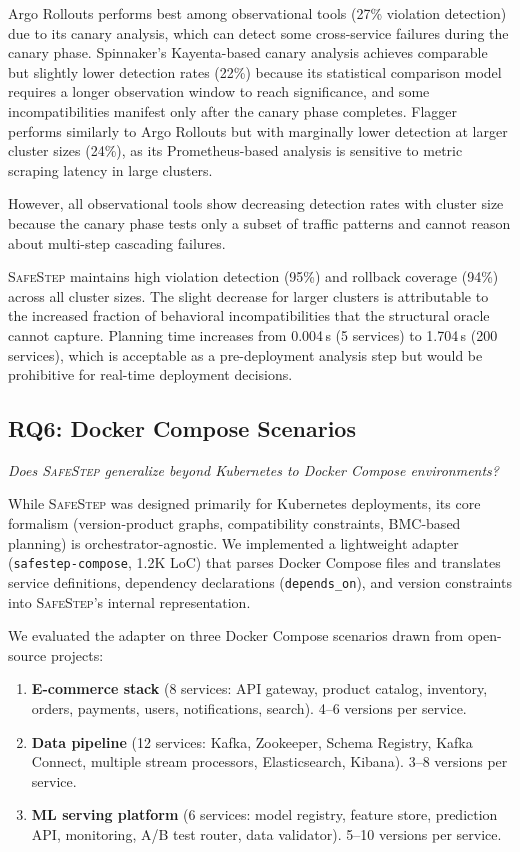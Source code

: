 \documentclass[10pt,twocolumn]{article}
\newcommand{\safestep}{\textsc{SafeStep}}
\begin{document}
Argo Rollouts performs best among observational tools
(27\% violation detection) due to its canary analysis,
which can detect some cross-service failures during the canary
phase. Spinnaker's Kayenta-based canary analysis achieves
comparable but slightly lower detection rates (22\%)
because its statistical comparison model requires a longer
observation window to reach significance, and some
incompatibilities manifest only after the canary phase
completes. Flagger performs similarly to Argo Rollouts but
with marginally lower detection at larger cluster sizes
(24\%), as its Prometheus-based analysis is sensitive
to metric scraping latency in large clusters.

However, all observational tools show decreasing detection rates
with cluster size because the canary phase tests only a subset
of traffic patterns and cannot reason about multi-step
cascading failures.

\safestep{} maintains high violation detection (95\%) and
rollback coverage (94\%) across all cluster sizes. The
slight decrease for larger clusters is attributable to the
increased fraction of behavioral incompatibilities that the
structural oracle cannot capture. Planning time increases
from 0.004\,s (5 services) to 1.704\,s (200 services), which
is acceptable as a pre-deployment analysis step but would be
prohibitive for real-time deployment decisions.

\subsection{RQ6: Docker Compose Scenarios}

\emph{Does \safestep{} generalize beyond Kubernetes to
Docker Compose environments?}

While \safestep{} was designed primarily for Kubernetes
deployments, its core formalism (version-product graphs,
compatibility constraints, BMC-based planning) is
orchestrator-agnostic. We implemented a lightweight adapter
(\texttt{safestep-compose}, 1.2K LoC) that parses Docker
Compose files and translates service definitions, dependency
declarations (\texttt{depends\_on}), and version constraints
into \safestep{}'s internal representation.

We evaluated the adapter on three Docker Compose scenarios
drawn from open-source projects:

\begin{enumerate}[leftmargin=*,nosep]
  \item \textbf{E-commerce stack} (8 services: API gateway,
    product catalog, inventory, orders, payments, users,
    notifications, search). 4--6 versions per service.
  \item \textbf{Data pipeline} (12 services: Kafka, Zookeeper,
    Schema Registry, Kafka Connect, multiple stream processors,
    Elasticsearch, Kibana). 3--8 versions per service.
  \item \textbf{ML serving platform} (6 services: model
    registry, feature store, prediction API, monitoring,
    A/B test router, data validator). 5--10 versions per
    service.
\end{enumerate}
\end{document}
